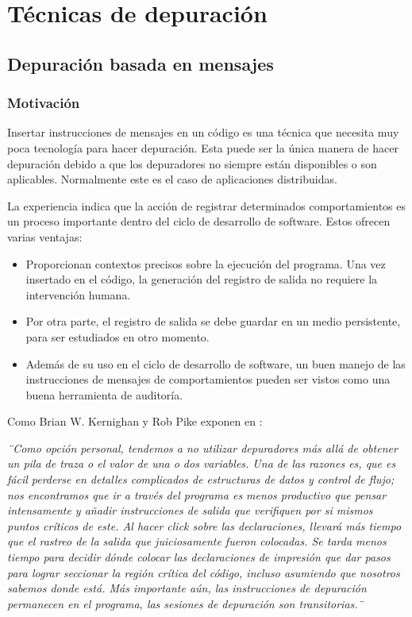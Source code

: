 \documentclass[12pt,legalpaper]{report}
\begin{document}
	\section{Técnicas de depuración}
		\subsection{Depuración basada en mensajes}
			\subsubsection{Motivación}
			
Insertar instrucciones de mensajes en un código es una técnica que necesita muy poca tecnología para hacer depuración.  Esta puede ser la única manera de hacer depuración debido a que los depuradores no siempre están disponibles o son aplicables. Normalmente este es el caso de aplicaciones distribuidas.

La experiencia indica que la acción de registrar determinados comportamientos es un proceso importante dentro del ciclo de desarrollo de software. Estos ofrecen varias ventajas:
\begin{itemize}
	\item Proporcionan contextos precisos sobre la ejecución del programa. Una vez insertado en el código, la generación del registro de salida no requiere la intervención humana.
	\item Por otra parte, el registro de salida se debe guardar en un medio persistente, para ser estudiados en otro momento.
	\item Además de su uso en el ciclo de desarrollo de software, un buen manejo de las instrucciones de mensajes de comportamientos pueden ser vistos como una buena herramienta de auditoría.
\end{itemize}


Como Brian W. Kernighan y Rob Pike exponen en \cite{thePracticeOfProgramming}:

\textit{¨Como opción personal, tendemos a no utilizar depuradores más allá de obtener un pila de traza o el valor de una o dos variables. Una de las razones es, que es fácil perderse en detalles complicados de estructuras de datos y control de flujo; nos encontramos que ir a través del programa es menos productivo que pensar intensamente y añadir instrucciones de salida que verifiquen por si mismos puntos críticos de este. Al hacer click sobre las declaraciones, llevará más tiempo que el rastreo de la salida que juiciosamente fueron colocadas. Se tarda menos tiempo para decidir dónde colocar las declaraciones de impresión que dar pasos para lograr seccionar la región crítica del código, incluso asumiendo que nosotros sabemos donde está. Más importante aún, las instrucciones de depuración permanecen en el programa, las sesiones de depuración son transitorias.¨}
\end{document}
